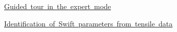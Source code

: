 
\begin{DoxyItemize}
\item \mbox{\hyperlink{guided_tour}{Guided tour in the expert mode}}
\item \mbox{\hyperlink{tutorial_swift}{Identification of Swift parameters from tensile data}} 
\end{DoxyItemize}